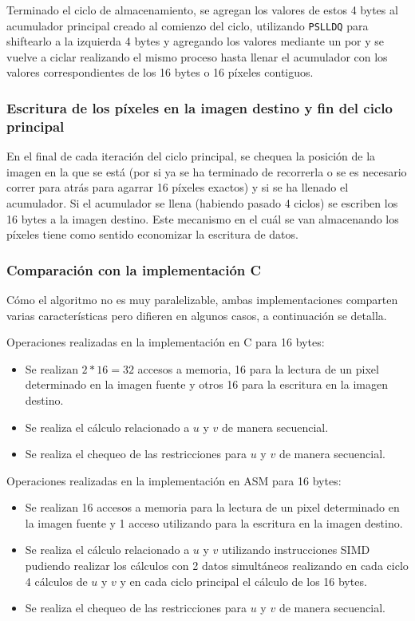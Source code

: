 Terminado el ciclo de almacenamiento, se agregan los valores de estos 4 bytes al acumulador principal creado al comienzo del ciclo, utilizando \texttt{PSLLDQ} para shiftearlo a la izquierda 4 bytes y agregando los valores mediante un por y se vuelve a ciclar realizando el mismo proceso hasta llenar el acumulador con los valores correspondientes de los 16 bytes o 16 píxeles contiguos.


\subsubsection{Escritura de los píxeles en la imagen destino y fin del ciclo principal}

En el final de cada iteración del ciclo principal, se chequea la posición de la imagen en la que se está (por si ya se ha terminado de recorrerla o se es necesario correr para atrás para agarrar 16 píxeles exactos) y si se ha llenado el acumulador. Si el acumulador se llena (habiendo pasado 4 ciclos) se escriben los 16 bytes a la imagen destino. Este mecanismo en el cuál se van almacenando los píxeles tiene como sentido economizar la escritura de datos.


\subsubsection{Comparación con la implementación C}

Cómo el algoritmo no es muy paralelizable, ambas implementaciones comparten varias características pero difieren en algunos casos, a continuación se detalla.

Operaciones realizadas en la implementación en C para 16 bytes:
\begin{itemize}
\item Se realizan $2 * 16 = 32$ accesos a memoria, 16 para la lectura de un pixel determinado en la imagen fuente y otros 16 para la escritura en la imagen destino.
\item Se realiza el cálculo relacionado a $u$ y $v$ de manera secuencial.
\item Se realiza el chequeo de las restricciones para $u$ y $v$ de manera secuencial.
\end{itemize}

Operaciones realizadas en la implementación en ASM para 16 bytes:
\begin{itemize}
\item Se realizan 16 accesos a memoria para la lectura de un pixel determinado en la imagen fuente y 1 acceso utilizando  para la escritura en la imagen destino.
\item Se realiza el cálculo relacionado a $u$ y $v$ utilizando instrucciones SIMD pudiendo realizar los cálculos con 2 datos simultáneos realizando en cada ciclo 4 cálculos de $u$ y $v$ y en cada ciclo principal el cálculo de los 16 bytes.
\item Se realiza el chequeo de las restricciones para $u$ y $v$ de manera secuencial.
\end{itemize}


